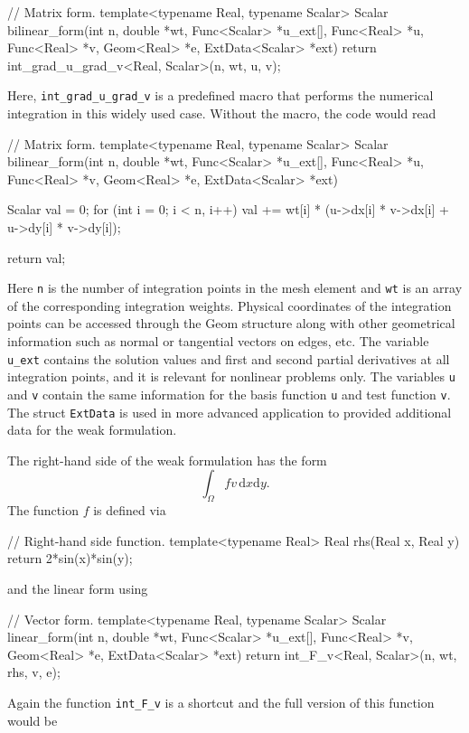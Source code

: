 \documentclass[final,3p,times,twocolumn]{elsarticle}
\begin{document}
\begin{code}
// Matrix form.
template<typename Real, typename Scalar>
Scalar bilinear_form(int n, double *wt, 
                     Func<Scalar> *u_ext[], 
                     Func<Real> *u, Func<Real> *v, 
                     Geom<Real> *e, 
                     ExtData<Scalar> *ext)
{
  return int_grad_u_grad_v<Real, Scalar>(n, wt, u, v);
}
\end{code}
Here, {\tt int\_grad\_u\_grad\_v} is a predefined macro 
that performs the numerical integration in this widely used
case. Without the macro, the code would read

\begin{code}
// Matrix form.
template<typename Real, typename Scalar>
Scalar bilinear_form(int n, double *wt, 
                     Func<Scalar> *u_ext[], 
                     Func<Real> *u, Func<Real> *v, 
                     Geom<Real> *e, 
                     ExtData<Scalar> *ext)
{
  Scalar val = 0;
  for (int i = 0; i < n, i++) {
    val += wt[i] * (u->dx[i] * v->dx[i] 
                    + u->dy[i] * v->dy[i]);
  }
  
  return val;
}
\end{code}
Here {\tt n} is the number of integration points in the mesh
element and {\tt wt} is an array of the corresponding integration
weights. Physical coordinates of the integration points can be 
accessed through the Geom structure along with other geometrical 
information such as normal or tangential vectors on edges, etc.
The variable {\tt u\_ext} contains the solution values and first and 
second partial derivatives at all integration points, and it is 
relevant for nonlinear problems only. The variables {\tt u} and 
{\tt v} contain the same information for the basis function {\tt u}
and test function {\tt v}. The struct {\tt ExtData} is used in 
more advanced application to provided additional data for the 
weak formulation.
 
The right-hand side of the weak formulation has the form 
$$
\int_{\Omega} fv\, \mbox{d}x\mbox{d}y.
$$
The function $f$ is defined via

\begin{code}
// Right-hand side function.
template<typename Real>
Real rhs(Real x, Real y)
{
  return 2*sin(x)*sin(y);
}
\end{code}
and the linear form using

\begin{code}
// Vector form.
template<typename Real, typename Scalar>
Scalar linear_form(int n, double *wt, 
                   Func<Scalar> *u_ext[], 
                   Func<Real> *v, Geom<Real> *e, 
                   ExtData<Scalar> *ext)
{
  return int_F_v<Real, Scalar>(n, wt, rhs, v, e);
}
\end{code}
Again the function {\tt int\_F\_v} is a shortcut and 
the full version of this function would be
\end{document}
